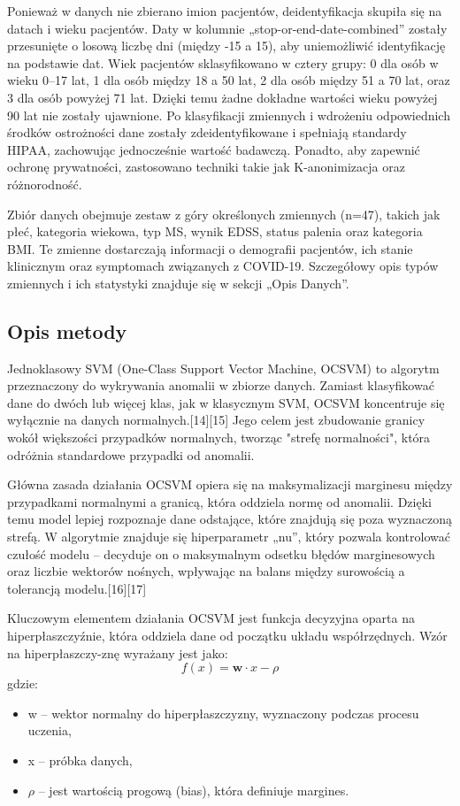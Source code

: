 \documentclass[a4paper,fleqn]{cas-dc}
\begin{document}
Ponieważ w danych nie zbierano imion pacjentów, deidentyfikacja skupiła się na datach i wieku pacjentów. Daty w kolumnie „stop-or-end-date-combined” zostały przesunięte o losową liczbę dni (między -15 a 15), aby uniemożliwić identyfikację na podstawie dat. Wiek pacjentów sklasyfikowano w cztery grupy: 0 dla osób w wieku 0–17 lat, 1 dla osób między 18 a 50 lat, 2 dla osób między 51 a 70 lat, oraz 3 dla osób powyżej 71 lat. Dzięki temu żadne dokładne wartości wieku powyżej 90 lat nie zostały ujawnione. Po klasyfikacji zmiennych i wdrożeniu odpowiednich środków ostrożności dane zostały zdeidentyfikowane i spełniają standardy HIPAA, zachowując jednocześnie wartość badawczą. Ponadto, aby zapewnić ochronę prywatności, zastosowano techniki takie jak K-anonimizacja oraz różnorodność.

Zbiór danych obejmuje zestaw z góry określonych zmiennych (n=47), takich jak płeć, kategoria wiekowa, typ MS, wynik EDSS, status palenia oraz kategoria BMI. Te zmienne dostarczają informacji o demografii pacjentów, ich stanie klinicznym oraz symptomach związanych z COVID-19. Szczegółowy opis typów zmiennych i ich statystyki znajduje się w sekcji „Opis Danych”.

\subsection{Opis metody}
Jednoklasowy SVM (One-Class Support Vector Machine, OCSVM) to algorytm przeznaczony do wykrywania anomalii w zbiorze danych. Zamiast klasyfikować dane do dwóch lub więcej klas, jak w klasycznym SVM, OCSVM koncentruje się wyłącznie na danych normalnych.[14][15] Jego celem jest zbudowanie granicy wokół większości przypadków normalnych, tworząc "strefę normalności", która odróżnia standardowe przypadki od anomalii.

Główna zasada działania OCSVM opiera się na maksymalizacji marginesu między przypadkami normalnymi a granicą, która oddziela normę od anomalii. Dzięki temu model lepiej rozpoznaje dane odstające, które znajdują się poza wyznaczoną strefą. W algorytmie znajduje się hiperparametr „nu”, który pozwala kontrolować czułość modelu – decyduje on o maksymalnym odsetku błędów marginesowych oraz liczbie wektorów nośnych, wpływając na balans między surowością a tolerancją modelu.[16][17]

Kluczowym elementem działania OCSVM jest funkcja decyzyjna oparta na hiperpłaszczyźnie, która oddziela dane od początku układu współrzędnych. Wzór na hiperpłaszczy-znę wyrażany jest jako:
\begin{equation}
    f(x) = \mathbf{w} \cdot x - \rho
\end{equation}
gdzie:
\begin{itemize}
\setlength\itemsep{0px}
    \item w – wektor normalny do hiperpłaszczyzny, wyznaczony podczas procesu uczenia,
    \item  x – próbka danych,
    \item  $\rho$ – jest wartością progową (bias), która definiuje margines.
\end{itemize}
\end{document}
